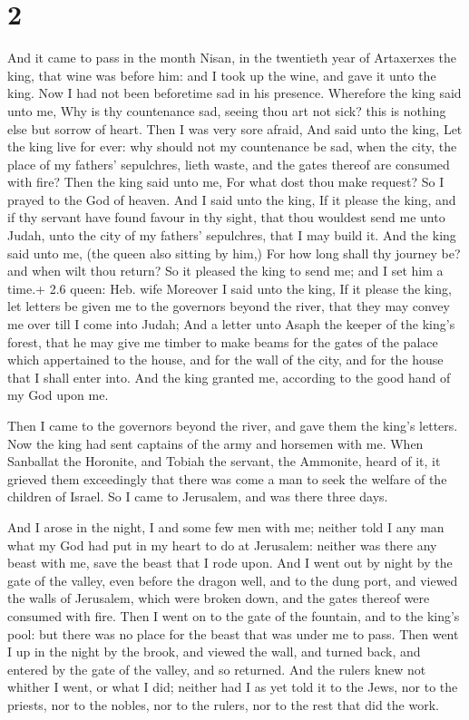 \hypertarget{section-1}{%
\section{2}\label{section-1}}

 And it came to pass in the month Nisan, in the twentieth
year of Artaxerxes the king, that wine was before him: and I took up the
wine, and gave it unto the king. Now I had not been beforetime sad in
his presence.  Wherefore the king said unto me, Why is thy
countenance sad, seeing thou art not sick? this is nothing else but
sorrow of heart. Then I was very sore afraid,  And said unto
the king, Let the king live for ever: why should not my countenance be
sad, when the city, the place of my fathers' sepulchres, lieth waste,
and the gates thereof are consumed with fire?  Then the king
said unto me, For what dost thou make request? So I prayed to the God of
heaven.  And I said unto the king, If it please the king,
and if thy servant have found favour in thy sight, that thou wouldest
send me unto Judah, unto the city of my fathers' sepulchres, that I may
build it.  And the king said unto me, (the queen also
sitting by him,) For how long shall thy journey be? and when wilt thou
return? So it pleased the king to send me; and I set him a time.+ 2.6
queen: Heb. wife  Moreover I said unto the king, If it
please the king, let letters be given me to the governors beyond the
river, that they may convey me over till I come into Judah; 
And a letter unto Asaph the keeper of the king's forest, that he may
give me timber to make beams for the gates of the palace which
appertained to the house, and for the wall of the city, and for the
house that I shall enter into. And the king granted me, according to the
good hand of my God upon me.

 Then I came to the governors beyond the river, and gave
them the king's letters. Now the king had sent captains of the army and
horsemen with me.  When Sanballat the Horonite, and Tobiah
the servant, the Ammonite, heard of it, it grieved them exceedingly that
there was come a man to seek the welfare of the children of Israel.
 So I came to Jerusalem, and was there three days.

 And I arose in the night, I and some few men with me;
neither told I any man what my God had put in my heart to do at
Jerusalem: neither was there any beast with me, save the beast that I
rode upon.  And I went out by night by the gate of the
valley, even before the dragon well, and to the dung port, and viewed
the walls of Jerusalem, which were broken down, and the gates thereof
were consumed with fire.  Then I went on to the gate of the
fountain, and to the king's pool: but there was no place for the beast
that was under me to pass.  Then went I up in the night by
the brook, and viewed the wall, and turned back, and entered by the gate
of the valley, and so returned.  And the rulers knew not
whither I went, or what I did; neither had I as yet told it to the Jews,
nor to the priests, nor to the nobles, nor to the rulers, nor to the
rest that did the work.

